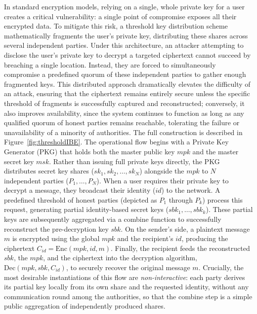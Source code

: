 In standard encryption models, relying on a single, whole private key for a user creates a critical vulnerability: a single point of compromise exposes all their encrypted data. To mitigate this risk, a threshold key distribution scheme mathematically fragments the user's private key, distributing these shares across several independent parties. Under this architecture, an attacker attempting to disclose the user's private key to decrypt a targeted ciphertext cannot succeed by breaching a single location. Instead, they are forced to simultaneously compromise a predefined quorum of these independent parties to gather enough fragmented keys. This distributed approach dramatically elevates the difficulty of an attack, ensuring that the ciphertext remains entirely secure unless the specific threshold of fragments is successfully captured and reconstructed; conversely, it also improves availability, since the system continues to function as long as any qualified quorum of honest parties remains reachable, tolerating the failure or unavailability of a minority of authorities. The full construction is described in Figure~\ref{fig:thresholdIBE}. The operational flow begins with a Private Key Generator (PKG) that holds both the master public key $mpk$ and the master secret key $msk$. Rather than issuing full private keys directly, the PKG distributes secret key shares ($sk_1, sk_2, \dots, sk_N$) alongside the $mpk$ to $N$ independent parties ($P_1, \dots, P_N$). When a user requires their private key to decrypt a message, they broadcast their identity ($id$) to the network. A predefined threshold of honest parties (depicted as $P_1$ through $P_k$) process this request, generating partial identity-based secret keys ($sbk_1, \dots, sbk_k$). These partial keys are subsequently aggregated via a combine function to successfully reconstruct the pre-decryption key $sbk$. On the sender's side, a plaintext message $m$ is encrypted using the global $mpk$ and the recipient's $id$, producing the ciphertext $C_{id} = \text{Enc}(mpk, id, m)$. Finally, the recipient feeds the reconstructed $sbk$, the $mpk$, and the ciphertext into the decryption algorithm, $\text{Dec}(mpk, sbk, C_{id})$, to securely recover the original message $m$. Crucially, the most desirable instantiations of this flow are \emph{non-interactive}: each party derives its partial key locally from its own share and the requested identity, without any communication round among the authorities, so that the combine step is a simple public aggregation of independently produced shares.


